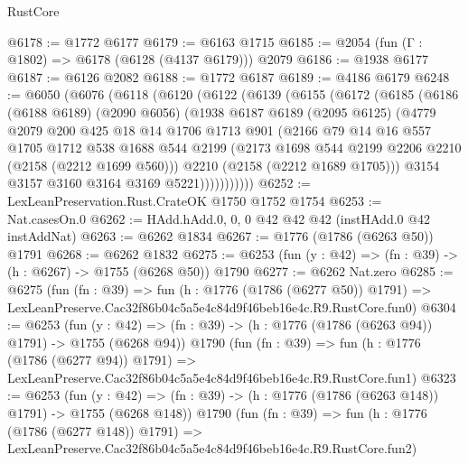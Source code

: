 \begin{lexlean}{RustCore}
\begin{coremodule}
@6178 := @1772 @6177
@6179 := @6163 @1715
@6185 := @2054 (fun (Γ : @1802) => @6178 (@6128 (@4137 @6179))) @2079
@6186 := @1938 @6177
@6187 := @6126 @2082
@6188 := @1772 @6187
@6189 := @4186 @6179
@6248 := @6050
    (@6076
      (@6118
        (@6120
          (@6122
            (@6139
              (@6155
                (@6172
                  (@6185
                    (@6186
                      (@6188 @6189)
                      (@2090 @6056)
                      (@1938
                        @6187
                        @6189
                        (@2095 @6125)
                        (@4779
                          @2079
                          @200
                          @425
                          @18
                          @14
                          @1706
                          @1713
                          @901
                          (@2166
                            @79
                            @14
                            @16
                            @557
                            @1705
                            @1712
                            @538
                            @1688
                            @544
                            @2199
                            (@2173 @1698 @544 @2199 @2206 @2210 (@2158 (@2212 @1699 @560)))
                            @2210
                            (@2158 (@2212 @1689 @1705)))
                          @3154
                          @3157
                          @3160
                          @3164
                          @3169
                          @5221)))))))))))
@6252 := LexLeanPreservation.Rust.CrateOK @1750 @1752 @1754
@6253 := Nat.casesOn.{0}
@6262 := HAdd.hAdd.{0, 0, 0} @42 @42 @42 (instHAdd.{0} @42 instAddNat)
@6263 := @6262 @1834
@6267 := @1776 (@1786 (@6263 @50)) @1791
@6268 := @6262 @1832
@6275 := @6253 (fun (y : @42) => (fn : @39) -> (h : @6267) -> @1755 (@6268 @50)) @1790
@6277 := @6262 Nat.zero
@6285 := @6275
    (fun (fn : @39) =>
    fun (h : @1776 (@1786 (@6277 @50)) @1791) =>
    LexLeanPreserve.Cac32f86b04c5a5e4c84d9f46beb16e4c.R9.RustCore.fun0)
@6304 := @6253
    (fun (y : @42) => (fn : @39) -> (h : @1776 (@1786 (@6263 @94)) @1791) -> @1755 (@6268 @94))
    @1790
    (fun (fn : @39) =>
    fun (h : @1776 (@1786 (@6277 @94)) @1791) =>
    LexLeanPreserve.Cac32f86b04c5a5e4c84d9f46beb16e4c.R9.RustCore.fun1)
@6323 := @6253
    (fun (y : @42) => (fn : @39) -> (h : @1776 (@1786 (@6263 @148)) @1791) -> @1755 (@6268 @148))
    @1790
    (fun (fn : @39) =>
    fun (h : @1776 (@1786 (@6277 @148)) @1791) =>
    LexLeanPreserve.Cac32f86b04c5a5e4c84d9f46beb16e4c.R9.RustCore.fun2)

\end{coremodule}
\end{lexlean}

